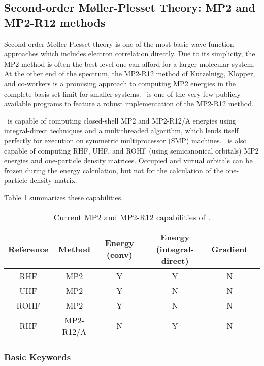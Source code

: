 \subsection{Second-order M\o ller-Plesset Theory: MP2 and MP2-R12 methods} \label{mp2}

Second-order M\o ller-Plesset theory is one of the most basic wave
function approaches which includes electron correlation
directly.
Due to its simplicity, the MP2 method is often the best
level one can afford for a larger molecular system.
At the other end of the spectrum, the MP2-R12 method
of Kutzelnigg, Klopper, and co-workers is a promising
approach to computing MP2 energies in the complete
basis set limit for smaller systems. \PSIthree\ is
one of the very few publicly available programs to
feature a robust implementation of the MP2-R12 method.

\PSIthree\ is capable of computing closed-shell
MP2 and MP2-R12/A energies using integral-direct techniques and a
multithreaded algorithm, which lends itself perfectly for execution 
on symmetric multiprocessor (SMP) machines. \PSIthree\ is also
capable of computing RHF, UHF, and ROHF (using semicanonical orbitals)
MP2 energies and one-particle density matrices.  Occupied and virtual
orbitals can be frozen during the energy calculation, but not for the 
calculation of the one-particle density matrix.

Table \ref{table:mp2summary} summarizes these capabilities.
\begin{table}[h]
\begin{center}
\begin{tabular}{cccccc}
\hline
\hline
Reference & Method    & Energy (conv) & Energy (integral-direct) & Gradient  \\
\hline
RHF       & MP2       & Y             & Y                        & N \\
UHF       & MP2       & Y             & N                        & N \\
ROHF      & MP2       & Y             & N                        & N \\
RHF       & MP2-R12/A & N             & Y                        & N \\
\hline
\hline
\end{tabular}
\end{center}
\caption{Current MP2 and MP2-R12 capabilities of \PSIthree.}
\label{table:mp2summary}
\end{table}

\subsubsection{Basic Keywords}

